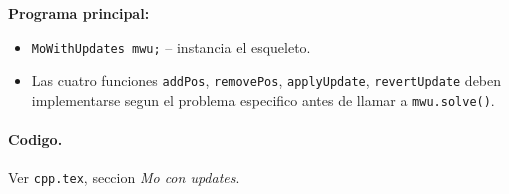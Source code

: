 \textbf{Programa principal:}
\begin{itemize}\setlength\itemsep{0pt}
	\item \verb|MoWithUpdates mwu;| -- instancia el esqueleto.
	\item Las cuatro funciones \verb|addPos|, \verb|removePos|, \verb|applyUpdate|, \verb|revertUpdate| deben implementarse segun el problema especifico antes de llamar a \verb|mwu.solve()|.
\end{itemize}

\paragraph{Codigo.}
Ver \texttt{cpp.tex}, seccion \textit{Mo con updates}.

\vspace{0.5em}
